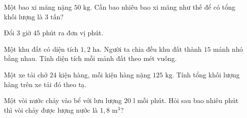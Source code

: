 \begin{ex} %
Một bao xi măng nặng $50\text{ kg}$. Cần bao nhiêu bao xi măng như thế để có tổng khối lượng là $3\text{ tấn}$?
\end{ex}

\begin{ex} %
Đổi $3$ giờ $45$ phút ra đơn vị phút.
\end{ex}

\begin{ex} %
Một khu đất có diện tích $1{,}2\text{ ha}$. Người ta chia đều khu đất thành $15$ mảnh nhỏ bằng nhau. Tính diện tích mỗi mảnh đất theo mét vuông.
\end{ex}

\begin{ex} %
Một xe tải chở $24$ kiện hàng, mỗi kiện hàng nặng $125\text{ kg}$. Tính tổng khối lượng hàng trên xe tải đó theo tạ.
\end{ex}

\begin{ex} %
Một vòi nước chảy vào bể với lưu lượng $20\text{ l}$ mỗi phút. Hỏi sau bao nhiêu phút thì vòi chảy được lượng nước là $1{,}8\text{ m}^3$?
\end{ex}
